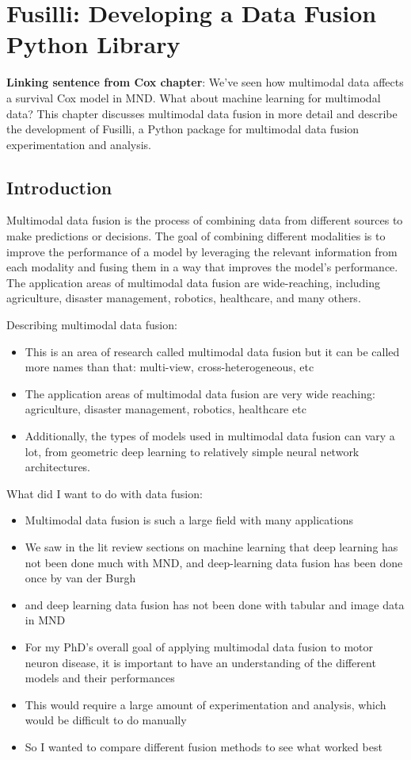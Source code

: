 \chapter{Fusilli: Developing a Data Fusion Python Library}
\label{fusilli_development}

\textbf{Linking sentence from Cox chapter}: 
We've seen how multimodal data affects a survival Cox model in MND.
What about machine learning for multimodal data?
This chapter discusses multimodal data fusion in more detail and describe the development of Fusilli, a Python package for multimodal data fusion experimentation and analysis.

\section{Introduction}

Multimodal data fusion is the process of combining data from different sources to make predictions or decisions.
The goal of combining different modalities is to improve the performance of a model by leveraging the relevant information from each modality and fusing them in a way that improves the model's performance.
The application areas of multimodal data fusion are wide-reaching, including agriculture, disaster management, robotics, healthcare, and many others.


Describing multimodal data fusion:
\begin{itemize}
    \item This is an area of research called multimodal data fusion but it can be called more names than that: multi-view, cross-heterogeneous, etc
    \item The application areas of multimodal data fusion are very wide reaching: agriculture, disaster management, robotics, healthcare etc
    \item Additionally, the types of models used in multimodal data fusion can vary a lot, from geometric deep learning to relatively simple neural network architectures.
\end{itemize}

What did I want to do with data fusion:
\begin{itemize}
    \item Multimodal data fusion is such a large field with many applications
    \item We saw in the lit review sections on machine learning that deep learning has not been done much with MND, and deep-learning data fusion has been done once by van der Burgh
    \item and deep learning data fusion has not been done with tabular and image data in MND
    \item For my PhD's overall goal of applying multimodal data fusion to motor neuron disease, it is important to have an understanding of the different models and their performances
    \item This would require a large amount of experimentation and analysis, which would be difficult to do manually
    \item So I wanted to compare different fusion methods to see what worked best
\end{itemize}

